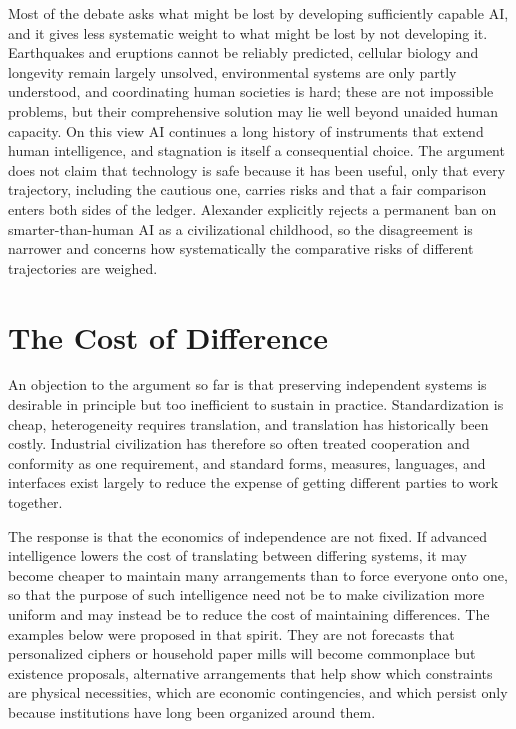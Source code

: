 \documentclass[11pt]{article}
\begin{document}
Most of the debate asks what might be lost by developing sufficiently capable AI, and it gives less systematic weight to what might be lost by not developing it. Earthquakes and eruptions cannot be reliably predicted, cellular biology and longevity remain largely unsolved, environmental systems are only partly understood, and coordinating human societies is hard; these are not impossible problems, but their comprehensive solution may lie well beyond unaided human capacity. On this view AI continues a long history of instruments that extend human intelligence, and stagnation is itself a consequential choice. The argument does not claim that technology is safe because it has been useful, only that every trajectory, including the cautious one, carries risks and that a fair comparison enters both sides of the ledger. Alexander explicitly rejects a permanent ban on smarter-than-human AI as a civilizational childhood, so the disagreement is narrower and concerns how systematically the comparative risks of different trajectories are weighed.

\section{The Cost of Difference}\label{sec:diff}

An objection to the argument so far is that preserving independent systems is desirable in principle but too inefficient to sustain in practice. Standardization is cheap, heterogeneity requires translation, and translation has historically been costly. Industrial civilization has therefore so often treated cooperation and conformity as one requirement, and standard forms, measures, languages, and interfaces exist largely to reduce the expense of getting different parties to work together.

The response is that the economics of independence are not fixed. If advanced intelligence lowers the cost of translating between differing systems, it may become cheaper to maintain many arrangements than to force everyone onto one, so that the purpose of such intelligence need not be to make civilization more uniform and may instead be to reduce the cost of maintaining differences. The examples below were proposed in that spirit. They are not forecasts that personalized ciphers or household paper mills will become commonplace but existence proposals, alternative arrangements that help show which constraints are physical necessities, which are economic contingencies, and which persist only because institutions have long been organized around them.
\end{document}
